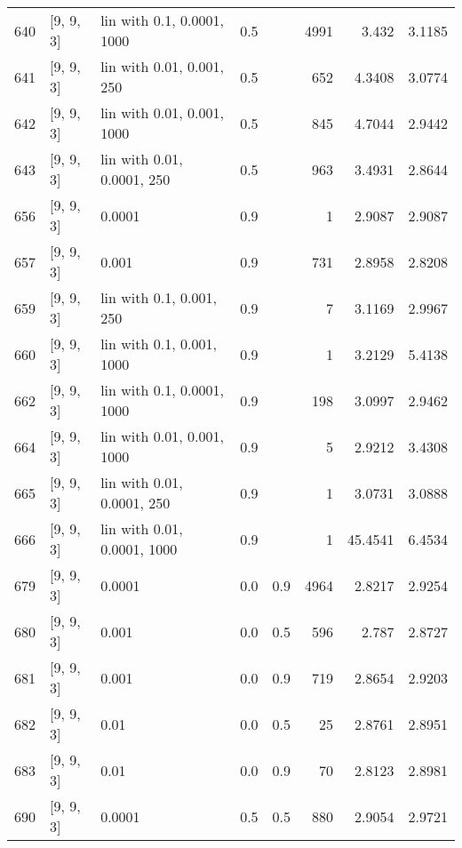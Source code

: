 \begin{longtable}{lllrrrrr}
  640 &          [9, 9, 3] &  lin with 0.1, 0.0001, 1000 &      0.5 &     & 4991 &    3.432 &   3.1185 \\
  641 &          [9, 9, 3] &   lin with 0.01, 0.001, 250 &      0.5 &     &  652 &   4.3408 &   3.0774 \\
  642 &          [9, 9, 3] &  lin with 0.01, 0.001, 1000 &      0.5 &     &  845 &   4.7044 &   2.9442 \\
  643 &          [9, 9, 3] &  lin with 0.01, 0.0001, 250 &      0.5 &     &  963 &   3.4931 &   2.8644 \\
  656 &          [9, 9, 3] &                      0.0001 &      0.9 &     &    1 &   2.9087 &   2.9087 \\
  657 &          [9, 9, 3] &                       0.001 &      0.9 &     &  731 &   2.8958 &   2.8208 \\
  659 &          [9, 9, 3] &    lin with 0.1, 0.001, 250 &      0.9 &     &    7 &   3.1169 &   2.9967 \\
  660 &          [9, 9, 3] &   lin with 0.1, 0.001, 1000 &      0.9 &     &    1 &   3.2129 &   5.4138 \\
  662 &          [9, 9, 3] &  lin with 0.1, 0.0001, 1000 &      0.9 &     &  198 &   3.0997 &   2.9462 \\
  664 &          [9, 9, 3] &  lin with 0.01, 0.001, 1000 &      0.9 &     &    5 &   2.9212 &   3.4308 \\
  665 &          [9, 9, 3] &  lin with 0.01, 0.0001, 250 &      0.9 &     &    1 &   3.0731 &   3.0888 \\
  666 &          [9, 9, 3] & lin with 0.01, 0.0001, 1000 &      0.9 &     &    1 &  45.4541 &   6.4534 \\
  679 &          [9, 9, 3] &                      0.0001 &      0.0 & 0.9 & 4964 &   2.8217 &   2.9254 \\
  680 &          [9, 9, 3] &                       0.001 &      0.0 & 0.5 &  596 &    2.787 &   2.8727 \\
  681 &          [9, 9, 3] &                       0.001 &      0.0 & 0.9 &  719 &   2.8654 &   2.9203 \\
  682 &          [9, 9, 3] &                        0.01 &      0.0 & 0.5 &   25 &   2.8761 &   2.8951 \\
  683 &          [9, 9, 3] &                        0.01 &      0.0 & 0.9 &   70 &   2.8123 &   2.8981 \\
  690 &          [9, 9, 3] &                      0.0001 &      0.5 & 0.5 &  880 &   2.9054 &   2.9721 \\

\end{longtable}
